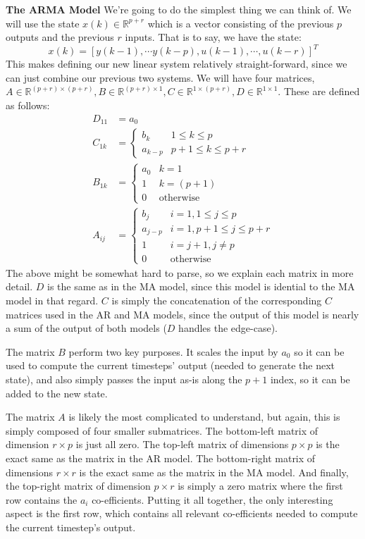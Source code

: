 \documentclass[12pt]{exam}
\begin{document}
\begin{questions}
\begin{solution}
\textbf{The ARMA Model}
We're going to do the simplest thing we can think of. We will use the state $x(k) \in \mathbb{R}^{p + r}$ which is a vector consisting of the previous $p$ outputs and the previous $r$ inputs. That is to say, we have the state:
$$
x(k) = [y(k-1), \cdots y(k-p), u(k-1), \cdots, u(k-r)]^T
$$
This makes defining our new linear system relatively straight-forward, since we can just combine our previous two systems. We will have four matrices, $A \in \mathbb{R}^{(p+r) \times (p + r)}, B \in \mathbb{R}^{(p+r) \times 1}, C \in \mathbb{R}^{1 \times (p + r)}, D \in \mathbb{R}^{1 \times 1}$. These are defined as follows:
\begin{align*}
  D_{11} &= a_0 \\
  C_{1k} &= 
    \begin{cases}
      b_k & 1 \leq k \leq p \\
      a_{k-p} & p + 1 \leq k \leq p+r
    \end{cases} \\
  B_{1k} &=
    \begin{cases}
      a_0 & k = 1 \\
      1 & k = (p + 1) \\
      0 & \text{otherwise}
    \end{cases} \\
  A_{ij} &= 
    \begin{cases}
      b_j & i = 1, 1 \leq j \leq p \\
      a_{j-p} & i = 1, p + 1 \leq j \leq p + r \\
      1 & i = j + 1, j \neq p \\
      0 & \text{otherwise}
    \end{cases} 
\end{align*}
The above might be somewhat hard to parse, so we explain each matrix in more detail. $D$ is the same as in the MA model, since this model is idential to the MA model in that regard. $C$ is simply the concatenation of the corresponding $C$ matrices used in the AR and MA models, since the output of this model is nearly a sum of the output of both models ($D$ handles the edge-case).

The matrix $B$ perform two key purposes. It scales the input by $a_0$ so it can be used to compute the current timesteps' output (needed to generate the next state), and also simply passes the input as-is along the $p+1$ index, so it can be added to the new state.

The matrix $A$ is likely the most complicated to understand, but again, this is simply composed of four smaller submatrices. The bottom-left matrix  of dimension $r \times p$ is just all zero. The top-left matrix of dimensions $p \times p$ is the exact same as the matrix in the AR model. The bottom-right matrix of dimensions $r \times r$ is the exact same as the matrix in the MA model. And finally, the top-right matrix of dimension $p \times r$ is simply a zero matrix where the first row contains the $a_i$ co-efficients. Putting it all together, the only interesting aspect is the first row, which contains all relevant co-efficients needed to compute the current timestep's output.


\end{solution}
\end{questions}
\end{document}

